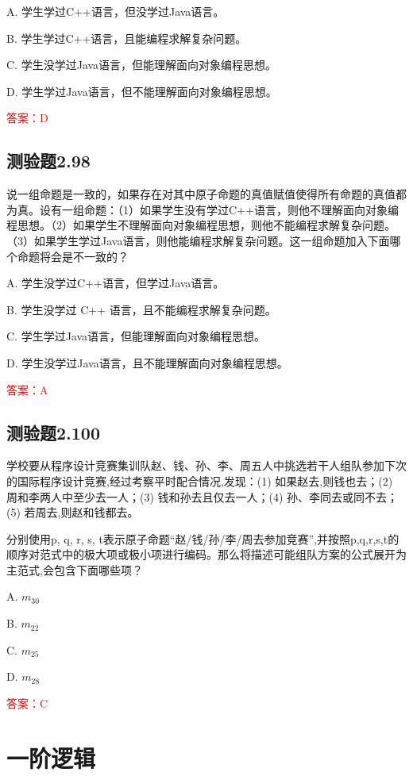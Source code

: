 \documentclass[UTF8, heading=true]{ctexart}
\begin{document}
A. 学生学过C++语言，但没学过Java语言。

B. 学生学过C++语言，且能编程求解复杂问题。

C. 学生没学过Java语言，但能理解面向对象编程思想。

D. 学生学过Java语言，但不能理解面向对象编程思想。

\textcolor{red}{答案：D}

\subsection{测验题2.98}

说一组命题是一致的，如果存在对其中原子命题的真值赋值使得所有命题的真值都为真。设有一组命题：（1）如果学生没有学过C++语言，则他不理解面向对象编程思想。（2）如果学生不理解面向对象编程思想，则他不能编程求解复杂问题。（3）如果学生学过Java语言，则他能编程求解复杂问题。这一组命题加入下面哪个命题将会是不一致的？

A. 学生没学过C++语言，但学过Java语言。

B. 学生没学过 C++ 语言，且不能编程求解复杂问题。

C. 学生学过Java语言，但能理解面向对象编程思想。

D. 学生没学过Java语言，且不能理解面向对象编程思想。

\textcolor{red}{答案：A}

\subsection{测验题2.100}

学校要从程序设计竞赛集训队赵、钱、孙、李、周五人中挑选若干人组队参加下次的国际程序设计竞赛,经过考察平时配合情况,发现：(1) 如果赵去,则钱也去；(2) 周和李两人中至少去一人；(3) 钱和孙去且仅去一人；(4) 孙、李同去或同不去；(5) 若周去,则赵和钱都去。

分别使用p, q, r, s, t表示原子命题“赵/钱/孙/李/周去参加竞赛”,并按照p,q,r,s,t的顺序对范式中的极大项或极小项进行编码。那么将描述可能组队方案的公式展开为主范式,会包含下面哪些项？

A. $ m_{30}$

B. $ m_{22}$

C. $ m_{25}$

D. $ m_{28}$

\textcolor{red}{答案：C}


\clearpage
\section{一阶逻辑}
\end{document}
